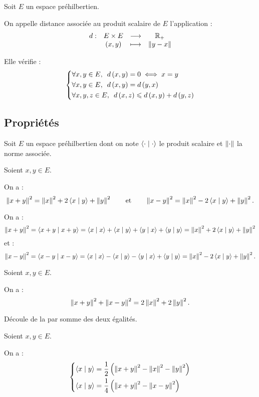 \begin{defprop}[Distance]
Soit \(E\) un espace préhilbertien.

On appelle distance associée au produit scalaire de \(E\) l'application : \[\fonction{d}{E\times E}{\Rp}{\paren{x,y}}{\norme{y-x}}\]

Elle vérifie : \[\begin{dcases}
\quantifs{\forall x,y\in E}d\paren{x,y}=0\ssi x=y \\
\quantifs{\forall x,y\in E}d\paren{x,y}=d\paren{y,x} \\
\quantifs{\forall x,y,z\in E}d\paren{x,z}\leq d\paren{x,y}+d\paren{y,z}
\end{dcases}\]
\end{defprop}

\subsection{Propriétés}

Soit \(E\) un espace préhilbertien dont on note \(\ps{\cdot}{\cdot}\) le produit scalaire et \(\norme{\cdot}\) la norme associée.

\begin{prop}
Soient \(x,y\in E\).

On a : \[\norme{x+y}^2=\norme{x}^2+2\ps{x}{y}+\norme{y}^2\qquad\text{et}\qquad\norme{x-y}^2=\norme{x}^2-2\ps{x}{y}+\norme{y}^2.\]
\end{prop}

\begin{dem}
On a : \[\norme{x+y}^2=\ps{x+y}{x+y}=\ps{x}{x}+\ps{x}{y}+\ps{y}{x}+\ps{y}{y}=\norme{x}^2+2\ps{x}{y}+\norme{y}^2\] et : \[\norme{x-y}^2=\ps{x-y}{x-y}=\ps{x}{x}-\ps{x}{y}-\ps{y}{x}+\ps{y}{y}=\norme{x}^2-2\ps{x}{y}+\norme{y}^2.\]
\end{dem}

\begin{theo}
Soient \(x,y\in E\).

On a : \[\norme{x+y}^2+\norme{x-y}^2=2\norme{x}^2+2\norme{y}^2.\]
\end{theo}

\begin{dem}
Découle de la  par somme des deux égalités.
\end{dem}

\begin{theo}
Soient \(x,y\in E\).

On a : \[\begin{dcases}
\ps{x}{y}=\dfrac{1}{2}\paren{\norme{x+y}^2-\norme{x}^2-\norme{y}^2} \\
\ps{x}{y}=\dfrac{1}{4}\paren{\norme{x+y}^2-\norme{x-y}^2}
\end{dcases}\]
\end{theo}

